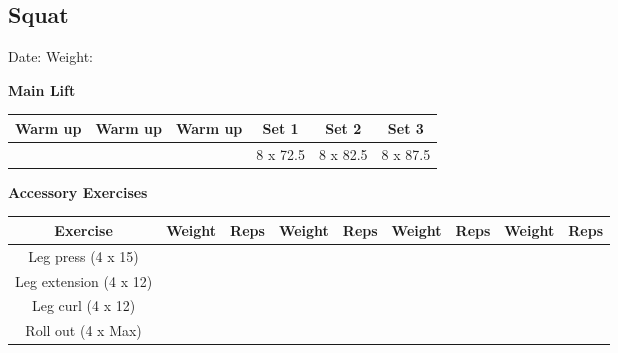 \documentclass{article}%
\begin{document}
\subsection*{Squat}%
Date: %
\linebreak%
Weight: %
\vspace*{20pt}%
\linebreak%
\begin{minipage}{0.5\textwidth}%
\textbf{Main Lift\newline%
\newline%
}%
\begin{tabular}{|c|c|c|c|c|c|}%
\hline%
Warm up&Warm up&Warm up&Set 1&Set 2&Set 3\\%
\hline%
&&&8 x 72.5&8 x 82.5&8 x 87.5\\%
\hline%
\end{tabular}%
\vspace*{20pt}%
\linebreak%
\textbf{Accessory Exercises\newline%
\newline%
}%
\begin{tabular}{|c|c|c|c|c|c|c|c|c|}%
\hline%
Exercise&Weight&Reps&Weight&Reps&Weight&Reps&Weight&Reps\\%
\hline%
Leg press (4 x 15)&&&&&&&&\\%
\hline%
Leg extension (4 x 12)&&&&&&&&\\%
\hline%
Leg curl (4 x 12)&&&&&&&&\\%
\hline%
Roll out (4 x Max)&&&&&&&&\\%
\hline%
\end{tabular}%
\end{minipage}%
\vspace*{20pt}%
\linebreak

%
\end{document}
